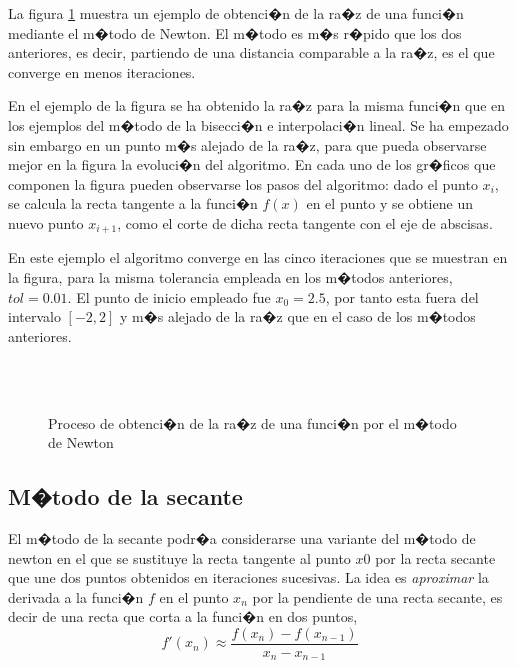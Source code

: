 La figura \ref{fig:newton2} muestra un ejemplo de obtenci�n de la ra�z de una funci�n mediante el m�todo de Newton. El m�todo es m�s r�pido que los dos anteriores, es decir, partiendo de una distancia comparable a la ra�z, es el que converge en menos iteraciones. 

En el ejemplo de la figura se ha obtenido la ra�z para la misma funci�n que en los ejemplos del m�todo de la bisecci�n e interpolaci�n lineal. Se ha empezado sin embargo en un punto m�s alejado de la ra�z, para que pueda observarse mejor en la figura la evoluci�n del algoritmo. En cada uno de los gr�ficos que componen la figura pueden observarse  los pasos del algoritmo: dado el punto  $x_i$, se calcula  la recta tangente a la funci�n $f(x)$ en el punto y se obtiene un nuevo punto $x_{i+1}$,  como el corte de dicha recta tangente con el eje de abscisas.

En este ejemplo el algoritmo converge en las cinco iteraciones que se muestran en la figura, para la misma tolerancia empleada en los m�todos anteriores, $tol=0.01$. El punto de inicio empleado fue $x_0=2.5$, por tanto esta fuera del intervalo $[-2, 2]$ y m�s alejado de la ra�z que en el caso de los m�todos anteriores.   

\begin{figure}
\centering
{} \qquad
{}\\
\qquad
{}\\
\qquad
{}

\caption{Proceso de obtenci�n de la ra�z de una funci�n por el m�todo de Newton}
\label{fig:newton2}
\end{figure}
\subsection{M�todo de la secante}
El m�todo de la secante podr�a considerarse una variante del m�todo de newton en el que se sustituye la recta tangente al punto $x0$ por la recta secante que une dos puntos obtenidos en iteraciones sucesivas. La idea es \emph{aproximar} la derivada a la funci�n $f$ en el punto $x_n$ por la pendiente de una recta secante, es decir de una recta que corta a la funci�n en dos puntos, 
\begin{equation*}
f'(x_n)\approx \frac{f(x_n)-f(x_{n-1})}{x_n-x_{n-1}}
\end{equation*}

